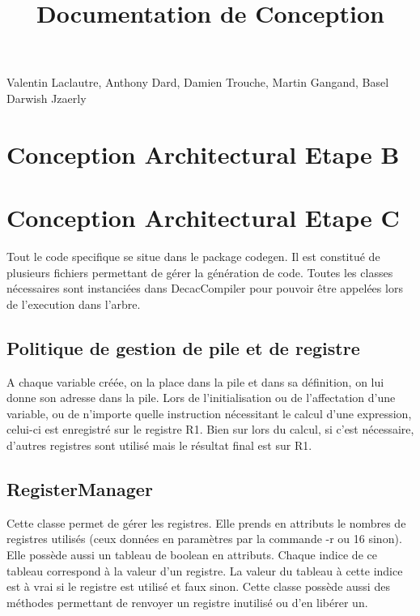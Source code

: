 \documentclass[12pt, a4paper, one side]{article}
\title{Documentation de Conception}
\author{}
\date{}
\begin{document}
\maketitle

\begin{center}
    Valentin Laclautre, Anthony Dard, Damien Trouche, Martin Gangand, Basel Darwish Jzaerly
\end{center}

\tableofcontents
\newpage

\section{Conception Architectural Etape B}

\section{Conception Architectural Etape C}

Tout le code specifique se situe dans le package codegen. Il est constitué de plusieurs fichiers
permettant de gérer la génération de code. Toutes les classes nécessaires sont instanciées dans DecacCompiler
pour pouvoir être appelées lors de l'execution dans l'arbre.

\subsection{Politique de gestion de pile et de registre}

A chaque variable créée, on la place dans la pile et dans sa définition, on lui donne son adresse dans la pile.
Lors de l'initialisation ou de l'affectation d'une variable, ou de n'importe quelle instruction nécessitant le
calcul d'une expression, celui-ci est enregistré sur le registre R1. Bien sur lors du calcul, si c'est nécessaire,
d'autres registres sont utilisé mais le résultat final est sur R1.

\subsection{RegisterManager}

Cette classe permet de gérer les registres. Elle prends en attributs le nombres de registres utilisés
(ceux données en paramètres par la commande -r ou 16 sinon). Elle possède aussi un tableau de boolean
en attributs. Chaque indice de ce tableau correspond à la valeur d'un registre. La valeur du tableau
à cette indice est à vrai si le registre est utilisé et faux sinon. Cette classe possède aussi des
méthodes permettant de renvoyer un registre inutilisé ou d'en libérer un.
\end{document}
